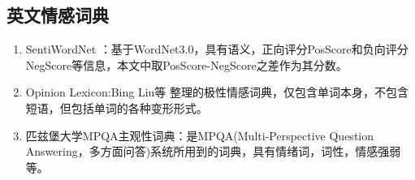 \subsection{英文情感词典}
\begin{enumerate}
\item SentiWordNet\cite{sentiwordnet} \cite{sentiwordnet3}：基于WordNet3.0，具有语义，正向评分PosScore和负向评分NegScore等信息，本文中取PosScore-NegScore之差作为其分数。
\item Opinion Lexicon:Bing Liu等\cite{huliu2004a} \cite{huliu05a} 整理的极性情感词典，仅包含单词本身，不包含短语，但包括单词的各种变形形式。
\item 匹兹堡大学MPQA主观性词典\cite{mpqa}：是MPQA(Multi-Perspective Question Answering，多方面问答)系统所用到的词典，具有情绪词，词性，情感强弱等。
\end{enumerate}